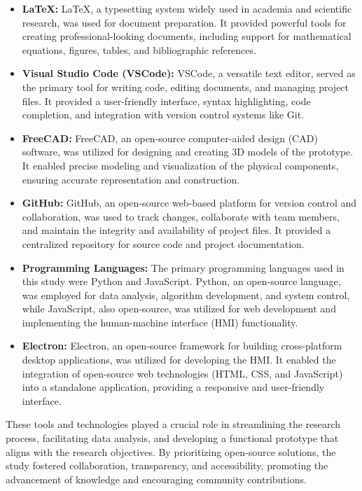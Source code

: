 \documentclass[../main.tex]{subfiles}
\begin{document}
    \begin{itemize}
        \item \textbf{LaTeX:} LaTeX, a typesetting system widely used in academia and scientific research, was used for document preparation. It provided powerful tools for creating professional-looking documents, including support for mathematical equations, figures, tables, and bibliographic references.
        
        \item \textbf{Visual Studio Code (VSCode):} VSCode, a versatile text editor, served as the primary tool for writing code, editing documents, and managing project files. It provided a user-friendly interface, syntax highlighting, code completion, and integration with version control systems like Git.
        
        \item \textbf{FreeCAD:} FreeCAD, an open-source computer-aided design (CAD) software, was utilized for designing and creating 3D models of the prototype. It enabled precise modeling and visualization of the physical components, ensuring accurate representation and construction.
        
        \item \textbf{GitHub:} GitHub, an open-source web-based platform for version control and collaboration, was used to track changes, collaborate with team members, and maintain the integrity and availability of project files. It provided a centralized repository for source code and project documentation.
        
        \item \textbf{Programming Languages:} The primary programming languages used in this study were Python and JavaScript. Python, an open-source language, was employed for data analysis, algorithm development, and system control, while JavaScript, also open-source, was utilized for web development and implementing the human-machine interface (HMI) functionality.
        
        \item \textbf{Electron:} Electron, an open-source framework for building cross-platform desktop applications, was utilized for developing the HMI. It enabled the integration of open-source web technologies (HTML, CSS, and JavaScript) into a standalone application, providing a responsive and user-friendly interface.
    \end{itemize}

    These tools and technologies played a crucial role in streamlining the research process, facilitating data analysis, and developing a functional prototype that aligns with the research objectives. By prioritizing open-source solutions, the study fostered collaboration, transparency, and accessibility, promoting the advancement of knowledge and encouraging community contributions.
\end{document}
